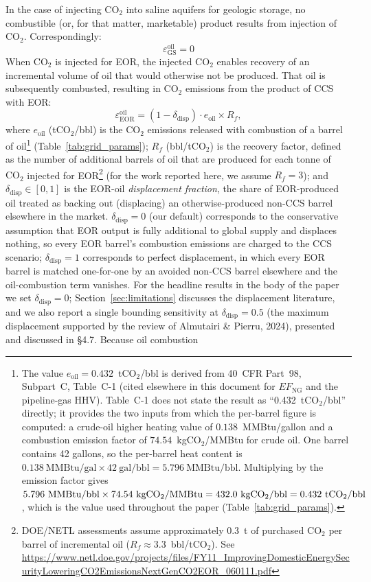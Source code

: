 \documentclass[11pt]{article}
\newcommand{\cotwo}{\ensuremath{\mathrm{CO_2}}}
\begin{document}
In the case of injecting \cotwo{} into saline aquifers for geologic storage, no combustible (or, for that matter, marketable) product results from injection of \cotwo{}. Correspondingly:
%
\begin{equation}
    \varepsilon_{\text{GS}}^{\text{oil}} = 0
\end{equation}
%
When \cotwo{} is injected for EOR, the injected \cotwo{} enables recovery of an incremental volume of oil that would otherwise not be produced. That oil is subsequently combusted, resulting in \cotwo{} emissions from the product of CCS with EOR:
%
\begin{equation}
  \varepsilon_{\text{EOR}}^{\text{oil}} = (1 - \delta_{\text{disp}}) \cdot e_{\text{oil}} \times R_f,
  \label{eq:product_eor}
\end{equation}
%
where $e_{\text{oil}}$ (t\cotwo{}/bbl) is the \cotwo{} emissions released with combustion of a barrel of oil\footnote{The value $e_{\text{oil}} = 0.432$~t\cotwo{}/bbl is derived from 40~CFR Part~98, Subpart~C, Table~C-1 (cited elsewhere in this document for $EF_{\text{NG}}$ and the pipeline-gas HHV). Table~C-1 does not state the result as ``0.432~t\cotwo{}/bbl'' directly; it provides the two inputs from which the per-barrel figure is computed: a crude-oil higher heating value of $0.138$~MMBtu/gallon and a combustion emission factor of $74.54$~kg\cotwo{}/MMBtu for crude oil. One barrel contains 42 gallons, so the per-barrel heat content is $0.138~\text{MMBtu/gal} \times 42~\text{gal/bbl} = 5.796~\text{MMBtu/bbl}$. Multiplying by the emission factor gives $5.796~\text{MMBtu/bbl} \times 74.54~\text{kg\cotwo{}/MMBtu} = 432.0~\text{kg\cotwo{}/bbl} = 0.432~\text{t\cotwo{}/bbl}$, which is the value used throughout the paper (Table~\ref{tab:grid_params}).} (Table~\ref{tab:grid_params}); $R_f$ (bbl/t\cotwo{}) is the recovery factor, defined as the number of additional barrels of oil that are produced for each tonne of \cotwo{} injected for EOR\footnote{DOE/NETL assessments assume approximately 0.3~t of purchased \cotwo{} per barrel of incremental oil ($R_f \approx 3.3$~bbl/t\cotwo{}). See \url{https://www.netl.doe.gov/projects/files/FY11_ImprovingDomesticEnergySecurityLoweringCO2EmissionsNextGenCO2EOR_060111.pdf}} (for the work reported here, we assume $R_f=3$); and $\delta_{\text{disp}} \in [0,1]$ is the EOR-oil \emph{displacement fraction}, the share of EOR-produced oil treated as backing out (displacing) an otherwise-produced non-CCS barrel elsewhere in the market. $\delta_{\text{disp}} = 0$ (our default) corresponds to the conservative assumption that EOR output is fully additional to global supply and displaces nothing, so every EOR barrel's combustion emissions are charged to the CCS scenario; $\delta_{\text{disp}} = 1$ corresponds to perfect displacement, in which every EOR barrel is matched one-for-one by an avoided non-CCS barrel elsewhere and the oil-combustion term vanishes. For the headline results in the body of the paper we set $\delta_{\text{disp}} = 0$; Section~\ref{sec:limitations} discusses the displacement literature, and we also report a single bounding sensitivity at $\delta_{\text{disp}} = 0.5$ (the maximum displacement supported by the review of Almutairi \& Pierru, 2024), presented and discussed in \S4.7. Because oil combustion 
\end{document}
